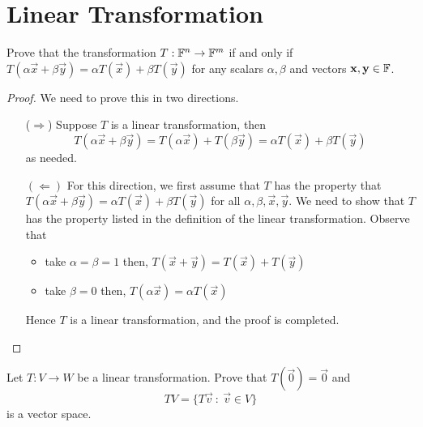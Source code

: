 \documentclass{article}
\begin{document}
\section{Linear Transformation}
\begin{homework}
  Prove that the transformation $T:\F^n\to\F^m$ if and only if 
  $T(\alpha\vec{x}+\beta\vec{y})=\alpha T(\vec{x})+\beta T(\vec{y})$
  for any scalars $\alpha,\beta$ and vectors 
  $\vec{x},\vec{y}\in\F$.
\end{homework}
\begin{proof}
  We need to prove this in two directions.
  \begin{itemize}
    \item[($\Rightarrow$)] Suppose $T$ is a linear transformation, 
      then 
      \[
        T(\alpha\vec{x}+\beta\vec{y})
        =T(\alpha\vec{x})+T(\beta\vec{y})
        =\alpha T(\vec{x})+\beta T(\vec{y})
      \]
      as needed.
    \item[$(\Leftarrow)$] For this direction, we first assume that
      $T$ has the property that 
      $T(\alpha\vec{x}+\beta\vec{y}) =\alpha T(\vec{x})+\beta T(\vec{y})$
      for all $\alpha,\beta,\vec{x},\vec{y}$. We need to show that
      $T$ has the property listed in the definition of the linear 
      transformation. Observe that
      \begin{itemize}
        \item take $\alpha=\beta=1$ then,
          $T(\vec{x}+\vec{y})=T(\vec{x})+T(\vec{y})$
        \item take $\beta=0$ then,
          $T(\alpha\vec{x})=\alpha T(\vec{x})$
      \end{itemize}
      Hence $T$ is a linear transformation, 
      and the proof is completed.
  \end{itemize}
\end{proof}
\begin{homework}
  Let $T:V\to W$ be a linear transformation. Prove that
  $T(\vec{0})=\vec{0}$ and 
  \[TV=\{T\vec{v}~:~\vec{v}\in V\}\]
  is a vector space.
\end{homework}
\end{document}
